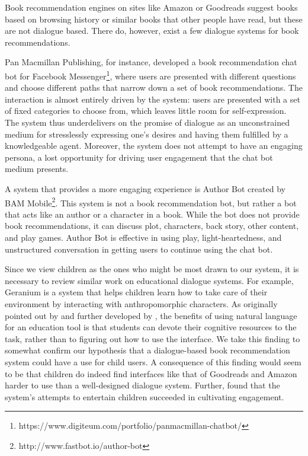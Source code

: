 \documentclass[11pt,a4paper]{article}
\begin{document}
Book recommendation engines on sites like Amazon or Goodreads suggest books based on browsing history or similar books that other people have read, but these are not dialogue based. There do, however, exist a few dialogue systems for book recommendations. 

Pan Macmillan Publishing, for instance, developed a book recommendation chat bot for Facebook Messenger\footnote{{https://www.digiteum.com/portfolio/panmacmillan-chatbot/}}, where users are presented with different questions and choose different paths that narrow down a set of book recommendations. The interaction is almost entirely driven by the system: users are presented with a set of fixed categories to choose from, which leaves little room for self-expression. The system thus underdelivers on the promise of dialogue as an unconstrained medium for stresslessly expressing one's desires and having them fulfilled by a knowledgeable agent. Moreover, the system does not attempt to have an engaging persona, a lost opportunity for driving user engagement that the chat bot medium presents.

A system that provides a more engaging experience is Author Bot created by BAM Mobile\footnote{{http://www.fastbot.io/author-bot}}. This system is not a book recommendation bot, but rather a bot that acts like an author or a character in a book. While the bot does not provide book recommendations, it can discuss plot, characters, back story, other content, and play games. Author Bot is effective in using play, light-heartedness, and unstructured conversation in getting users to continue using the chat bot.

Since we view children as the ones who might be most drawn to our system, it is necessary to review similar work on educational dialogue systems. For example, Geranium \cite{Griol:13} is a system that helps children learn how to take care of their environment by interacting with anthropomorphic characters. As originally pointed out by \citeauthor{beun2003embodied}  and further developed by \citeauthor{Griol:13} , the benefits of using natural language for an education tool is that students can devote their cognitive resources to the task, rather than to figuring out how to use the interface. We take this finding to somewhat confirm our hypothesis that a dialogue-based book recommendation system could have a use for child users. A consequence of this finding would seem to be that children do indeed find interfaces like that of Goodreads and Amazon harder to use than a well-designed dialogue system. Further, \citeauthor{Griol:13}  found that the system's attempts to entertain children succeeded in cultivating engagement.
\end{document}

